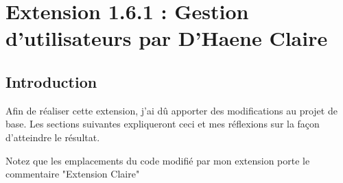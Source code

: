 \section{Extension 1.6.1 : Gestion d’utilisateurs par D’Haene Claire}
\subsection{Introduction}
\begin{flushleft}
Afin de réaliser cette extension, j'ai dû apporter des modifications au projet de base.
Les sections suivantes expliqueront ceci et mes réflexions sur la façon d'atteindre le résultat.
\end{flushleft}

\begin{flushleft}
Notez que les emplacements du code modifié par mon extension porte le commentaire "Extension Claire"
\end{flushleft} 
